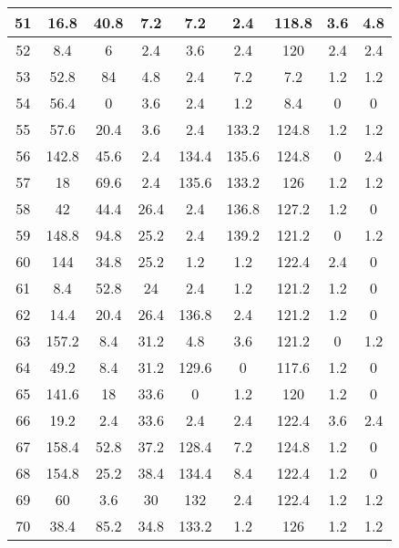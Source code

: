 \begin{table}[h!]
\begin{tabular}{|c|c|c|c|c|c|c|c|c|}
51           & 16.8  & 40.8 & 7.2  & 7.2   & 2.4   & 118.8 & 3.6   & 4.8   \\ \hline
52           & 8.4   & 6    & 2.4  & 3.6   & 2.4   & 120   & 2.4   & 2.4   \\ \hline
53           & 52.8  & 84   & 4.8  & 2.4   & 7.2   & 7.2   & 1.2   & 1.2   \\ \hline
54           & 56.4  & 0    & 3.6  & 2.4   & 1.2   & 8.4   & 0     & 0     \\ \hline
55           & 57.6  & 20.4 & 3.6  & 2.4   & 133.2 & 124.8 & 1.2   & 1.2   \\ \hline
56           & 142.8 & 45.6 & 2.4  & 134.4 & 135.6 & 124.8 & 0     & 2.4   \\ \hline
57           & 18    & 69.6 & 2.4  & 135.6 & 133.2 & 126   & 1.2   & 1.2   \\ \hline
58           & 42    & 44.4 & 26.4 & 2.4   & 136.8 & 127.2 & 1.2   & 0     \\ \hline
59           & 148.8 & 94.8 & 25.2 & 2.4   & 139.2 & 121.2 & 0     & 1.2   \\ \hline
60           & 144   & 34.8 & 25.2 & 1.2   & 1.2   & 122.4 & 2.4   & 0     \\ \hline
61           & 8.4   & 52.8 & 24   & 2.4   & 1.2   & 121.2 & 1.2   & 0     \\ \hline
62           & 14.4  & 20.4 & 26.4 & 136.8 & 2.4   & 121.2 & 1.2   & 0     \\ \hline
63           & 157.2 & 8.4  & 31.2 & 4.8   & 3.6   & 121.2 & 0     & 1.2   \\ \hline
64           & 49.2  & 8.4  & 31.2 & 129.6 & 0     & 117.6 & 1.2   & 0     \\ \hline
65           & 141.6 & 18   & 33.6 & 0     & 1.2   & 120   & 1.2   & 0     \\ \hline
66           & 19.2  & 2.4  & 33.6 & 2.4   & 2.4   & 122.4 & 3.6   & 2.4   \\ \hline
67           & 158.4 & 52.8 & 37.2 & 128.4 & 7.2   & 124.8 & 1.2   & 0     \\ \hline
68           & 154.8 & 25.2 & 38.4 & 134.4 & 8.4   & 122.4 & 1.2   & 0     \\ \hline
69           & 60    & 3.6  & 30   & 132   & 2.4   & 122.4 & 1.2   & 1.2   \\ \hline
70           & 38.4  & 85.2 & 34.8 & 133.2 & 1.2   & 126   & 1.2   & 1.2   \\ \hline
\end{tabular}
\end{table}
